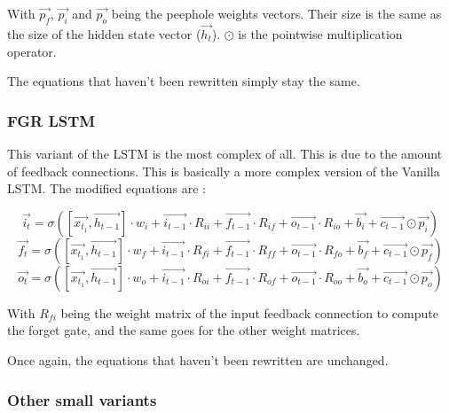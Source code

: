With $\overrightarrow{p_f}$, $\overrightarrow{p_i}$ and $\overrightarrow{p_o}$ being the peephole weights vectors. Their size is the same as the size of the hidden state vector ($\overrightarrow{h_t}$). $\odot$ is the pointwise multiplication operator.

The equations that haven't been rewritten simply stay the same.

\subsubsection{\acf{FGR} \ac{LSTM}}
This variant of the \ac{LSTM} is the most complex of all. This is due to the amount of feedback connections. This is basically a more complex version of the Vanilla \ac{LSTM}. The modified equations are :

\begin{equation}\label{eq:inputGFGR}
  \overrightarrow{i_t}=\sigma ([\overrightarrow{x_{t_1}},\overrightarrow{h_{t-1}}]\cdot w_i  + \overrightarrow{i_{t-1}}\cdot R_{ii} + \overrightarrow{f_{t-1}}\cdot R_{if} + \overrightarrow{o_{t-1}}\cdot R_{io} + \overrightarrow{b_i} +\overrightarrow{c_{t-1}}\odot \overrightarrow{p_i})
\end{equation}
\begin{equation}\label{eq:forgetGFGR}
  \overrightarrow{f_t}=\sigma ([\overrightarrow{x_{t_1}},\overrightarrow{h_{t-1}}]\cdot w_f  + \overrightarrow{i_{t-1}}\cdot R_{fi} + \overrightarrow{f_{t-1}}\cdot R_{ff} + \overrightarrow{o_{t-1}}\cdot R_{fo} + \overrightarrow{b_f} +\overrightarrow{c_{t-1}}\odot \overrightarrow{p_f})
\end{equation}
\begin{equation}\label{eq:ouputGFGR}
  \overrightarrow{o_t}=\sigma ([\overrightarrow{x_{t_1}},\overrightarrow{h_{t-1}}]\cdot w_o + \overrightarrow{i_{t-1}}\cdot R_{oi} + \overrightarrow{f_{t-1}}\cdot R_{of} + \overrightarrow{o_{t-1}}\cdot R_{oo} + \overrightarrow{b_o} +\overrightarrow{c_{t-1}}\odot \overrightarrow{p_o})
\end{equation}

With $R_{fi}$ being the weight matrix of the input feedback connection to compute the forget gate, and the same goes for the other weight matrices.

Once again, the equations that haven't been rewritten are unchanged.

\subsubsection{Other small variants}

